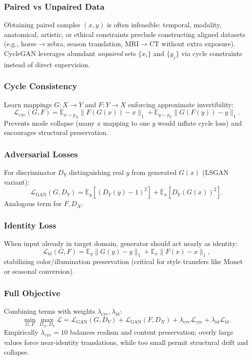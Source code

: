 \documentclass[11pt]{article}
\begin{document}
\subsubsection{Paired vs Unpaired Data} Obtaining paired samples $(x,y)$ is often infeasible: temporal, modality, anatomical, artistic, or ethical constraints preclude constructing aligned datasets (e.g., horse$\to$zebra, season translation, MRI$\to$CT without extra exposure). CycleGAN leverages abundant \emph{unpaired} sets $\{x_i\}$ and $\{y_j\}$ via cycle constraints instead of direct supervision.

\subsubsection{Cycle Consistency} Learn mappings $G:X\to Y$ and $F:Y\to X$ enforcing approximate invertibility:
\begin{equation}
 \mathcal{L}_{\text{cyc}}(G,F) = \mathbb{E}_{x\sim p_X} \|F(G(x)) - x\|_1 + \mathbb{E}_{y\sim p_Y} \|G(F(y)) - y\|_1.
\end{equation}
Prevents mode collapse (many $x$ mapping to one $y$ would inflate cycle loss) and encourages structural preservation.

\subsubsection{Adversarial Losses} For discriminator $D_Y$ distinguishing real $y$ from generated $G(x)$ (LSGAN variant):
\begin{equation}
 \mathcal{L}_{\text{GAN}}(G,D_Y) = \mathbb{E}_{y}[ (D_Y(y)-1)^2 ] + \mathbb{E}_{x}[ D_Y(G(x))^2 ].
\end{equation}
Analogous term for $F,D_X$.

\subsubsection{Identity Loss} When input already in target domain, generator should act nearly as identity:
\begin{equation}
 \mathcal{L}_{\text{id}}(G,F) = \mathbb{E}_{y}\|G(y)-y\|_1 + \mathbb{E}_{x}\|F(x)-x\|_1,
\end{equation}
stabilizing color/illumination preservation (critical for style transfers like Monet or seasonal conversion).

\subsubsection{Full Objective} Combining terms with weights $\lambda_{\text{cyc}}, \lambda_{\text{id}}$:
\begin{equation}
 \min_{G,F} \max_{D_X,D_Y} \mathcal{L} = \mathcal{L}_{\text{GAN}}(G,D_Y) + \mathcal{L}_{\text{GAN}}(F,D_X) + \lambda_{\text{cyc}} \mathcal{L}_{\text{cyc}} + \lambda_{\text{id}} \mathcal{L}_{\text{id}}.
\end{equation}
Empirically $\lambda_{\text{cyc}}=10$ balances realism and content preservation; overly large values force near-identity translations, while too small permit structural drift and collapse.
\end{document}
